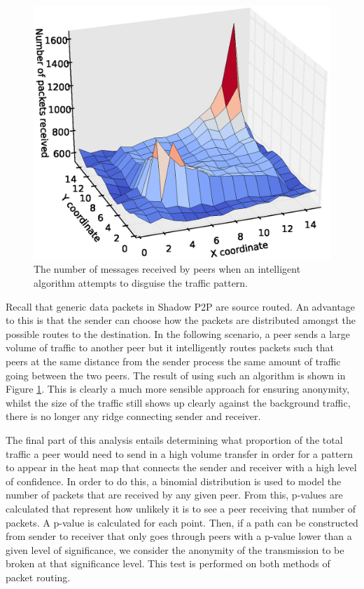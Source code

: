 \documentclass[ %
                    author={Luke Murray},
                supervisor={Dr. Simon Hollis},
                     title={Shadow Peer-to-Peer Networks},
                  subtitle={},
                    degree={MEng},
                      year={2013} ]{thesis}
\begin{document}
\begin{figure}[h]
    \centering
    \begin{minipage}[b]{0.8\linewidth}
        \centering
        \includegraphics[width=\linewidth]{diagrams/heat_map_clever.eps}
        \caption{The number of messages received by peers when an intelligent algorithm attempts to disguise the traffic pattern.}
        \label{heatmap_clever}
    \end{minipage}
\end{figure}

Recall that generic data packets in Shadow P2P are source routed. An advantage to this is that the sender can choose how the packets are distributed amongst the possible routes to the destination. In the following scenario, a peer sends a large volume of traffic to another peer but it intelligently routes packets such that peers at the same distance from the sender process the same amount of traffic going between the two peers. The result of using such an algorithm is shown in Figure \ref{heatmap_clever}. This is clearly a much more sensible approach for ensuring anonymity, whilst the size of the traffic still shows up clearly against the background traffic, there is no longer any ridge connecting sender and receiver.

The final part of this analysis entails determining what proportion of the total traffic a peer would need to send in a high volume transfer in order for a pattern to appear in the heat map that connects the sender and receiver with a high level of confidence. In order to do this, a binomial distribution is used to model the number of packets that are received by any given peer. From this, p-values are calculated that represent how unlikely it is to see a peer receiving that number of packets. A p-value is calculated for each point. Then, if a path can be constructed from sender to receiver that only goes through peers with a p-value lower than a given level of significance, we consider the anonymity of the transmission to be broken at that significance level. This test is performed on both methods of packet routing.
\end{document}
